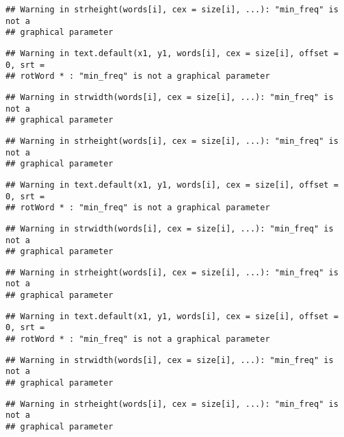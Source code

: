 \documentclass[]{article}
\begin{document}
\begin{verbatim}
## Warning in strheight(words[i], cex = size[i], ...): "min_freq" is not a
## graphical parameter
\end{verbatim}

\begin{verbatim}
## Warning in text.default(x1, y1, words[i], cex = size[i], offset = 0, srt =
## rotWord * : "min_freq" is not a graphical parameter
\end{verbatim}

\begin{verbatim}
## Warning in strwidth(words[i], cex = size[i], ...): "min_freq" is not a
## graphical parameter
\end{verbatim}

\begin{verbatim}
## Warning in strheight(words[i], cex = size[i], ...): "min_freq" is not a
## graphical parameter
\end{verbatim}

\begin{verbatim}
## Warning in text.default(x1, y1, words[i], cex = size[i], offset = 0, srt =
## rotWord * : "min_freq" is not a graphical parameter
\end{verbatim}

\begin{verbatim}
## Warning in strwidth(words[i], cex = size[i], ...): "min_freq" is not a
## graphical parameter
\end{verbatim}

\begin{verbatim}
## Warning in strheight(words[i], cex = size[i], ...): "min_freq" is not a
## graphical parameter
\end{verbatim}

\begin{verbatim}
## Warning in text.default(x1, y1, words[i], cex = size[i], offset = 0, srt =
## rotWord * : "min_freq" is not a graphical parameter
\end{verbatim}

\begin{verbatim}
## Warning in strwidth(words[i], cex = size[i], ...): "min_freq" is not a
## graphical parameter
\end{verbatim}

\begin{verbatim}
## Warning in strheight(words[i], cex = size[i], ...): "min_freq" is not a
## graphical parameter
\end{verbatim}
\end{document}
